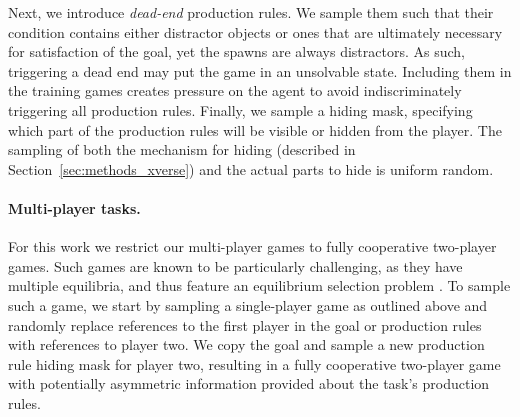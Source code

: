 Next, we introduce {\it dead-end} production rules. We sample them such that their condition contains either distractor objects or ones that are ultimately necessary for satisfaction of the goal, yet the spawns are always distractors. As such, triggering a dead end may put the game in an unsolvable state. Including them in the training games creates pressure on the agent to avoid indiscriminately triggering all production rules. Finally, we sample a hiding mask, specifying which part of the production rules will be visible or hidden from the player. The sampling of both the mechanism for hiding (described in Section~\ref{sec:methods_xverse}) and the actual parts to hide is uniform random.

\paragraph{Multi-player tasks.} For this work we restrict our multi-player games to fully cooperative two-player games. Such games are known to be particularly challenging, as they have multiple equilibria, and thus feature an equilibrium selection problem \citep{DBLP:journals/corr/abs-2012-08630}. To sample such a game, we start by sampling a single-player game as outlined above and randomly replace references to the first player in the goal or production rules with references to player two. We copy the goal and sample a new production rule hiding mask for player two, resulting in a fully cooperative two-player game with potentially asymmetric information provided about the task's production rules.